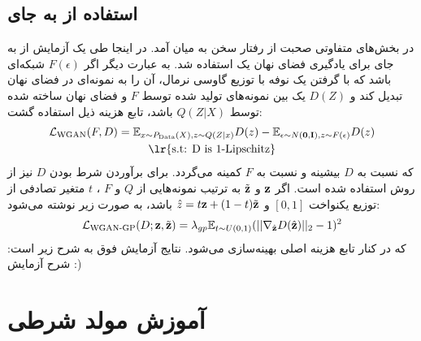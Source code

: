 \subsection{استفاده از  \gan{} به جای \mmd{}}
در بخش‌های متفاوتی صحبت از رفتار \modecollapse{} 
\gan{}
سخن به میان آمد. در اینجا طی یک آزمایش از  به جای \mmd{} برای یادگیری فضای نهان یک \autoencoder{} استفاده شد. به عبارت دیگر اگر $F(\epsilon)$ شبکه‌ای باشد که با گرفتن یک نوفه با توزیع گاوسی نرمال، آن را به نمونه‌ای در فضای نهان تبدیل کند و $D(Z)$ یک \critic{} بین نمونه‌های تولید شده توسط $F$ و فضای نهان ساخته شده توسط \encoder{} 
$Q(Z|X)$
باشد، تابع هزینه ذیل استفاده گشت:
\begin{gather}
 \mathcal{L}_\text{WGAN} (F, D)= 
   \expected_{x \sim P_\text{Data}(X), z \sim Q(Z|x)} D(z)
 - \expected_{\epsilon \sim N(\bff{0}, \bff{I}), z \sim F(\epsilon)} D(z)
  \\
\text{\lr{s.t: D is 1-Lipschitz}} \nonumber
\end{gather}
که نسبت به $D$ بیشینه و نسبت به $F$ کمینه می‌گردد. برای برآوردن شرط  بودن $D$ نیز از روش  استفاده شده است. اگر ${\bf z}$ و $\tilde{{\bf z}}$ به ترتیب نمونه‌هایی از $Q$ و $F$ ،
 $t$
  متغیر تصادفی از توزیع یکنواخت $[0,1]$ و 
  $\hat{z} = t{\bf z} + (1 - t) \tilde{{\bf z}}$
  باشد،  به صورت زیر نوشته می‌شود:
\begin{gather}
\mathcal{L}_\text{WGAN-GP} (D; {\bf z}, \tilde{{\bf z}}) = \lambda_{gp} \mathbb E_{t \sim U(0, 1)}
(|| \nabla_{\hat{{\bf z}}} D(\hat{{\bf z}}) ||_2  - 1)^2
\end{gather}
که در کنار تابع هزینه اصلی بهینه‌سازی می‌شود. نتایج آزمایش فوق به شرح زیر است:
شرح آزمایش :)
\\

\section{آموزش مولد شرطی}

